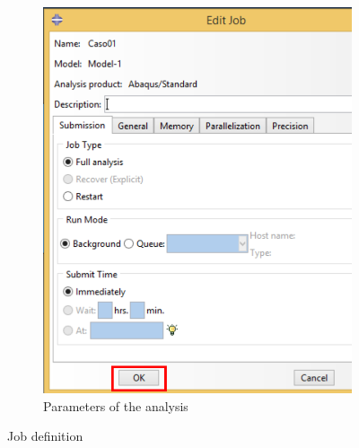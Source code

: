 \begin{figure}[!h]
\begin{subfigure}[!h]{0.44\textwidth}
      \includegraphics[width=\textwidth]{./body/images/job03.pdf}
      \caption{Parameters of the analysis}
      \label{job03}
    \end{subfigure}%
    \caption{Job definition}
  \end{figure}

